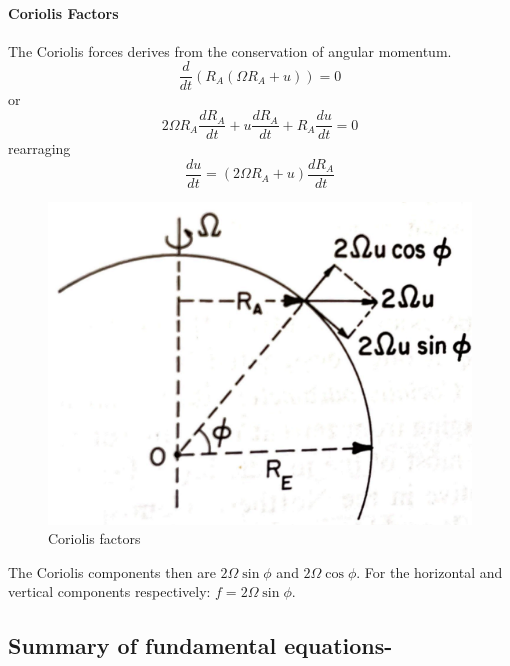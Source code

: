 \paragraph{Coriolis Factors}
The Coriolis forces derives from the conservation of angular momentum.
$$\frac{d}{dt}\left(R_A(\Omega R_A+u)\right)=0$$
or
$$2\Omega R_A\frac{dR_A}{dt}+u\frac{dR_A}{dt}+R_A\frac{du}{dt}=0$$
rearraging
$$\frac{du}{dt}=(2\Omega R_A+u)\frac{dR_A}{dt}$$
\begin{figure}[h!]
	\centering
	\includegraphics[width=0.35\linewidth]{upload/Screenshot 2024-11-21 164025.png}
	\caption{Coriolis factors}
	\label{fig:coriolis}
\end{figure}
The Coriolis components then are $2\Omega\sin\phi$ and $2\Omega\cos\phi$. For the horizontal and vertical components respectively:
$f=2\Omega\sin\phi$.

\subsection{Summary of fundamental
	equations-}\label{summary-of-fundamental-equations}

